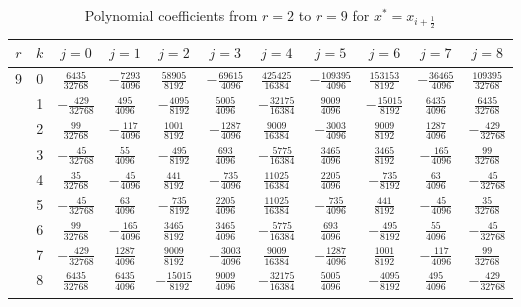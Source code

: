 \begin{table}
  \begin{center}
    \caption{Polynomial coefficients from $r=2$ to $r=9$ for $x^*=x_{i+\frac{1}{2}}$}
    \label{tab:polynomial_coefficients}
    \begin{tabular}{ccccccccccc}
      \toprule
      $r$  &  $k$  &  $j=0$  &  $j=1$  &  $j=2$  &  $j=3$  &  $j=4$  &  $j=5$  &  $j=6$  &  $j=7$  &  $j=8$  \\
      \midrule
      9  &  0  &  $ \frac{6435}{32768}$  &  $-\frac{7293}{4096}$  &  $ \frac{58905}{8192}$  &  $-\frac{69615}{4096}$  &  $ \frac{425425}{16384}$  &  $-\frac{109395}{4096}$  &  $ \frac{153153}{8192}$  &  $-\frac{36465}{4096}$  &  $ \frac{109395}{32768}$ \\ \addlinespace
         &  1  &  $-\frac{ 429}{32768}$  &  $ \frac{ 495}{4096}$  &  $-\frac{ 4095}{8192}$  &  $ \frac{ 5005}{4096}$  &  $-\frac{ 32175}{16384}$  &  $ \frac{  9009}{4096}$  &  $-\frac{ 15015}{8192}$  &  $ \frac{ 6435}{4096}$  &  $ \frac{  6435}{32768}$ \\ \addlinespace
         &  2  &  $ \frac{  99}{32768}$  &  $-\frac{ 117}{4096}$  &  $ \frac{ 1001}{8192}$  &  $-\frac{ 1287}{4096}$  &  $ \frac{  9009}{16384}$  &  $-\frac{  3003}{4096}$  &  $ \frac{  9009}{8192}$  &  $ \frac{ 1287}{4096}$  &  $-\frac{   429}{32768}$ \\ \addlinespace
         &  3  &  $-\frac{  45}{32768}$  &  $ \frac{  55}{4096}$  &  $-\frac{  495}{8192}$  &  $ \frac{  693}{4096}$  &  $-\frac{  5775}{16384}$  &  $ \frac{  3465}{4096}$  &  $ \frac{  3465}{8192}$  &  $-\frac{  165}{4096}$  &  $ \frac{    99}{32768}$ \\ \addlinespace
         &  4  &  $ \frac{  35}{32768}$  &  $-\frac{  45}{4096}$  &  $ \frac{  441}{8192}$  &  $-\frac{  735}{4096}$  &  $ \frac{ 11025}{16384}$  &  $ \frac{  2205}{4096}$  &  $-\frac{   735}{8192}$  &  $ \frac{   63}{4096}$  &  $-\frac{    45}{32768}$ \\ \addlinespace
         &  5  &  $-\frac{  45}{32768}$  &  $ \frac{  63}{4096}$  &  $-\frac{  735}{8192}$  &  $ \frac{ 2205}{4096}$  &  $ \frac{ 11025}{16384}$  &  $-\frac{   735}{4096}$  &  $ \frac{   441}{8192}$  &  $-\frac{   45}{4096}$  &  $ \frac{    35}{32768}$ \\ \addlinespace
         &  6  &  $ \frac{  99}{32768}$  &  $-\frac{ 165}{4096}$  &  $ \frac{ 3465}{8192}$  &  $ \frac{ 3465}{4096}$  &  $-\frac{  5775}{16384}$  &  $ \frac{   693}{4096}$  &  $-\frac{   495}{8192}$  &  $ \frac{   55}{4096}$  &  $-\frac{    45}{32768}$ \\ \addlinespace
         &  7  &  $-\frac{ 429}{32768}$  &  $ \frac{1287}{4096}$  &  $ \frac{ 9009}{8192}$  &  $-\frac{ 3003}{4096}$  &  $ \frac{  9009}{16384}$  &  $-\frac{  1287}{4096}$  &  $ \frac{  1001}{8192}$  &  $-\frac{  117}{4096}$  &  $ \frac{    99}{32768}$ \\ \addlinespace
         &  8  &  $ \frac{6435}{32768}$  &  $ \frac{6435}{4096}$  &  $-\frac{15015}{8192}$  &  $ \frac{ 9009}{4096}$  &  $-\frac{ 32175}{16384}$  &  $ \frac{  5005}{4096}$  &  $-\frac{  4095}{8192}$  &  $ \frac{  495}{4096}$  &  $-\frac{   429}{32768}$ \\ \addlinespace


\end{tabular}
\end{center}
\end{table}
